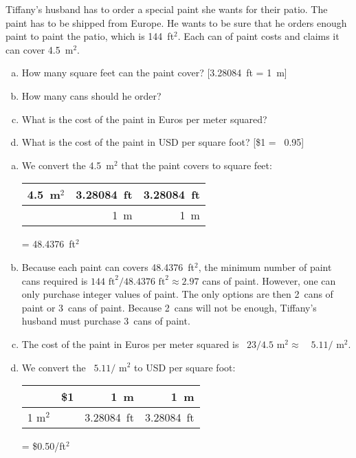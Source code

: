 \documentclass[11pt,letterpaper]{article}
\begin{document}
 Tiffany's husband has to order a special paint she wants for their patio. The paint has to be shipped from Europe. He wants to be sure that he orders enough paint to paint the patio, which is 144~ft$^2$. Each can of paint costs  and claims it can cover 4.5~m$^2$.
	\begin{enumerate}[(a)]
	\item How many square feet can the paint cover? [3.28084~ft = 1~m]
	\item How many cans should he order?
	\item What is the cost of the paint in Euros per meter squared?
	\item What is the cost of the paint in USD per square foot? [\$1 = \texteuro\ 0.95]
	\end{enumerate} \pspace

\sol
\begin{enumerate}[(a)]
\item We convert the 4.5~m$^2$ that the paint covers to square feet:
	\begin{table}[!ht]
	\centering
	\begin{tabular}{r|r|r}
	4.5~m$^2$ & 3.28084~ft & 3.28084~ft \\ \hline
			  & 1~m 		& 1~m 
	\end{tabular}
	= 48.4376~ft$^2$
	\end{table} \pspace

\item Because each paint can covers 48.4376~ft$^2$, the minimum number of paint cans required is $144 \text{ ft}^2/ 48.4376 \text{ ft}^2 \approx 2.97$ cans of paint. However, one can only purchase integer values of paint. The only options are then 2~cans of paint or 3~cans of paint. Because 2~cans will not be enough, Tiffany's husband must purchase 3~cans of paint. \pspace

\item The cost of the paint in Euros per meter squared is \texteuro~$23/4.5 \text{ m}^2 \approx$~\texteuro~$ 5.11/ \text{ m}^2$. \pspace

\item We convert the \texteuro~$ 5.11/ \text{ m}^2$ to USD per square foot:
	\begin{table}[!ht]
	\centering
	\begin{tabular}{r|r|r|r}
	\texteuro 5.11   & \$1			 & 1~m		& 1~m \\ \hline
	1 m$^2$ 		& \texteuro 0.95 & 3.28084~ft   & 3.28084~ft
	\end{tabular}
	= \$0.50/ft$^2$
	\end{table} 
\end{enumerate}
\end{document}
